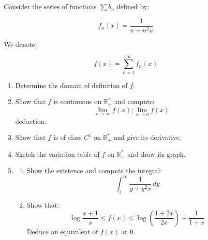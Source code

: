 \documentclass[12pt]{article}
\begin{document}
\section{}
Consider the series of functions \(\sum b_n\) defined by:

\[
f_n(x) = \frac{1}{n + n^2 x}
\]

We denote:

\[
f(x) = \sum_{n=1}^\infty f_n(x)
\]

\begin{enumerate}
    \item Determine the domain of definition of \(f\).
    
    \item Show that \(f\) is continuous on \(\mathbb{R}^*_+\) and compute: 
    $$
    \lim_{x \to \infty} f(x) ; \lim_{x \to 0} f(x)
    $$
    deduction. 
    
    \item Show that \(f\) is of class \(C^1\) on \(\mathbb{R}^*_+\) and give its derivative.
    
    \item Sketch the variation table of \(f\) on \(\mathbb{R}^*_+\) and draw its graph.
    
    \item 
    \begin{enumerate}
      \item Show the existence and compute the integral:
      \[
      \int_1^\infty \frac{1}{y + y^2 x} \, dy
      \]
      
      \item Show that:
      \[
      \log \frac{x+1}{x} \leq f(x) \leq \log \left( \frac{1+2x}{2x} \right) + \frac{1}{1+x}
      \]
      Deduce an equivalent of \( f(x) \) at 0.
    \end{enumerate}   
\end{enumerate}
\end{document}
